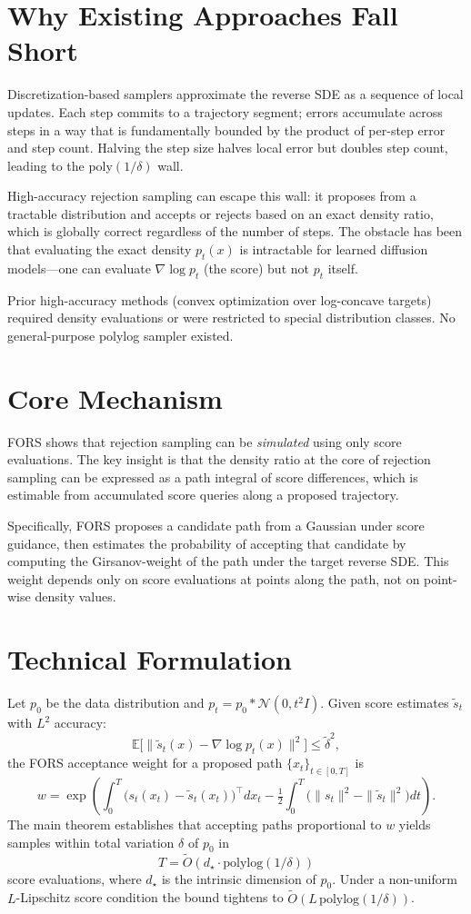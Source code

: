 \documentclass[10pt,twocolumn]{article}
\begin{document}
\section{Why Existing Approaches Fall Short}

Discretization-based samplers approximate the reverse SDE as a sequence of
local updates. Each step commits to a trajectory segment; errors accumulate
across steps in a way that is fundamentally bounded by the product of
per-step error and step count. Halving the step size halves local error but
doubles step count, leading to the poly$(1/\delta)$ wall.

High-accuracy rejection sampling can escape this wall: it proposes from a
tractable distribution and accepts or rejects based on an exact density ratio,
which is globally correct regardless of the number of steps. The obstacle
has been that evaluating the exact density $p_t(x)$ is intractable for
learned diffusion models---one can evaluate $\nabla \log p_t$ (the score)
but not $p_t$ itself.

Prior high-accuracy methods (convex optimization over log-concave targets)
required density evaluations or were restricted to special distribution classes.
No general-purpose polylog sampler existed.

\section{Core Mechanism}

FORS shows that rejection sampling can be \emph{simulated} using only score
evaluations. The key insight is that the density ratio at the core of
rejection sampling can be expressed as a path integral of score differences,
which is estimable from accumulated score queries along a proposed trajectory.

Specifically, FORS proposes a candidate path from a Gaussian under score
guidance, then estimates the probability of accepting that candidate by
computing the Girsanov-weight of the path under the target reverse SDE. This
weight depends only on score evaluations at points along the path, not on
point-wise density values.

\section{Technical Formulation}

Let $p_0$ be the data distribution and $p_t = p_0 * \mathcal{N}(0, t^2 I)$.
Given score estimates $\tilde{s}_t$ with $L^2$ accuracy:
\[
\mathbb{E}\bigl[\|\tilde{s}_t(x) - \nabla\!\log p_t(x)\|^2\bigr]
  \leq \tilde{\delta}^2,
\]
the FORS acceptance weight for a proposed path $\{x_t\}_{t\in[0,T]}$ is
\[
w = \exp\!\left(
  \int_0^T \bigl(s_t(x_t) - \tilde{s}_t(x_t)\bigr)^{\!\top} dx_t
  - \tfrac{1}{2}\int_0^T \bigl(\|s_t\|^2 - \|\tilde{s}_t\|^2\bigr) dt
\right).
\]
The main theorem establishes that accepting paths proportional to $w$ yields
samples within total variation $\delta$ of $p_0$ in
\[
T = \widetilde{O}\!\left(d_\star \cdot \mathrm{polylog}(1/\delta)\right)
\]
score evaluations, where $d_\star$ is the intrinsic dimension of $p_0$.
Under a non-uniform $L$-Lipschitz score condition the bound tightens to
$\widetilde{O}(L\,\mathrm{polylog}(1/\delta))$.
\end{document}
